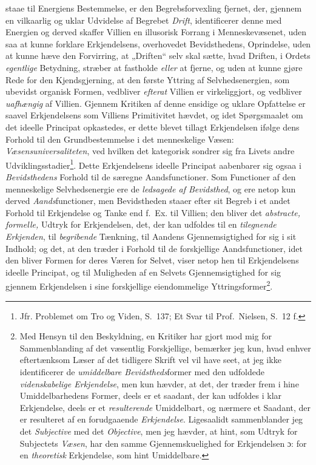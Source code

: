 staae til Energiens Bestemmelse, er den Begrebsforvexling fjernet, der,
gjennem en vilkaarlig og uklar Udvidelse af Begrebet \emph{Drift},
identificerer denne med Energien og derved skaffer Villien en illusorisk
Forrang i Menneskevæsenet, uden saa at kunne forklare Erkjendelsens,
overhovedet Bevidsthedens,
 \setcounter{footnote}{0}%
Oprindelse, uden at kunne hæve den Forvirring, at „Driften“ selv skal sætte,
hvad Driften, i Ordets \emph{egentlige} Betydning, stræber at fastholde
\emph{eller} at fjerne, og uden at kunne gjøre Rede for den Kjendsgjerning, at
den første Yttring af Selvhedsenergien, som ubevidst organisk Formen,
vedbliver \emph{efterat} Villien er virkeliggjort, og vedbliver
\emph{uafhængig} af Villien. Gjennem Kritiken af denne ensidige og uklare
Opfattelse er saavel Erkjendelsens som Villiens Primitivitet hævdet, og idet
Spørgsmaalet om det ideelle Principat opkastedes, er dette blevet tillagt
Erkjendelsen ifølge dens Forhold til den Grundbestemmelse i det menneskelige
Væsen: \emph{Væsensuniversaliteten}, ved hvilken det kategorisk sondrer sig
fra Livets andre Udviklingsstadier\footnote{Jfr. Problemet om Tro og Viden,
S.\ 137; Et Svar til Prof.\ Nielsen, S.\ 12 f.}.
Dette Erkjendelsens ideelle Principat aabenbarer sig ogsaa i
\emph{Bevidsthedens} Forhold til de særegne Aandsfunctioner. Som Functioner af
den menneskelige Selvhedsenergie ere de \emph{ledsagede af Bevidsthed}, og ere
netop kun derved \emph{Aands}functioner, men Bevidstheden staaer efter sit
Begreb i et andet Forhold til Erkjendelse og Tanke end f.\ Ex. til Villien;
den bliver det \emph{abstracte, formelle,} Udtryk for Erkjendelsen, det, der
kan udfoldes til en \emph{tilegnende Erkjenden}, til \emph{begribende}
Tænkning, til Aandens Gjennemsigtighed for sig i sit Indhold; og det, at den
træder i Forhold til de forskjellige Aandsfunctioner, idet den bliver Formen
for deres Væren for Selvet, viser netop hen til Erkjendelsens ideelle
Principat, og til Muligheden af en Selvets Gjennemsigtighed for sig gjennem
Erkjendelsen i sine forskjellige eiendommelige
Yttringsformer\footnote{Med Hensyn til den Beskyldning, en Kritiker har gjort
mod mig for Sammenblanding af det væsentlig Forskjellige, bemærker jeg kun,
hvad enhver eftertænksom Læser af det tidligere Skrift vel vil have seet, at
jeg ikke identificerer de \emph{umiddelbare Bevidstheds}former med den
udfoldede \emph{videnskabelige Erkjendelse}, men kun hævder, at det, der
træder frem i hine Umiddelbarhedens Former, deels er et saadant, der kan
udfoldes i klar Erkjendelse, deels er et \emph{resulterende} Umiddelbart, og
nærmere et Saadant, der er resulteret af en forudgaaende \emph{Erkjendelse}.
Ligesaalidt sammenblander jeg det \emph{Subjective} med det \emph{Objective},
men jeg hævder, at hint, som Udtryk for Subjectets \emph{Væsen}, har den samme
Gjennemskuelighed for Erkjendelsen ɔ: for en \emph{theoretisk} Erkjendelse, som
hint Umiddelbare.}.
